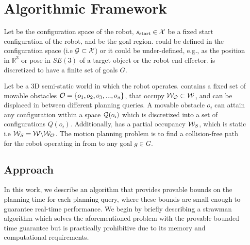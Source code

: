 \documentclass[a4paper]{report}
\begin{document}
\section{Algorithmic Framework}
\label{subsec:setup}
Let \calX be the configuration space of the robot, $s_{\textrm{start}} \in \mathcal{X}$ be a fixed start configuration of the robot, and \calG be the goal region. 
\calG could be defined in the configuration space \calX (i.e $\mathcal{G} \subset \mathcal{X}$) or it could be under-defined, e.g., as the position in $\mathbb{R}^3$ or pose in $SE(3)$ of a target object or the robot end-effector. \calG is discretized to have a finite set of goals $G$. 

Let \calW be a 3D semi-static world in which the robot operates. \calW contains a fixed set of movable obstacles $\mathcal{O} = \{o_1, o_2, o_3,...,o_n\}$, that occupy $\mathcal{W}_\mathcal{O} \subset \mathcal{W}$, and can be displaced in between different planning queries. A movable obstacle $o_i$ can attain any configuration within a space $\mathcal{Q}(o_i)$ which is discretized into a set of configurations $Q(o_i)$. Additionally, \calW has a partial occupancy $\mathcal{W}_S$, which is static i.e $\mathcal{W}_S = \mathcal{W} \backslash \mathcal{W}_\mathcal{O}$. The motion planning problem is to find a collision-free path for the robot operating in \calW from \Sstart to any goal $g \in G$.


\subsection{Approach}
In this work, we describe an algorithm that provides provable bounds on the planning time for each planning query, where these bounds are small enough to guarantee real-time performance.
We begin by briefly describing a strawman algorithm which solves the aforementioned problem with the provable bounded-time guarantee but is practically prohibitive due to its memory and computational requirements.
\end{document}
